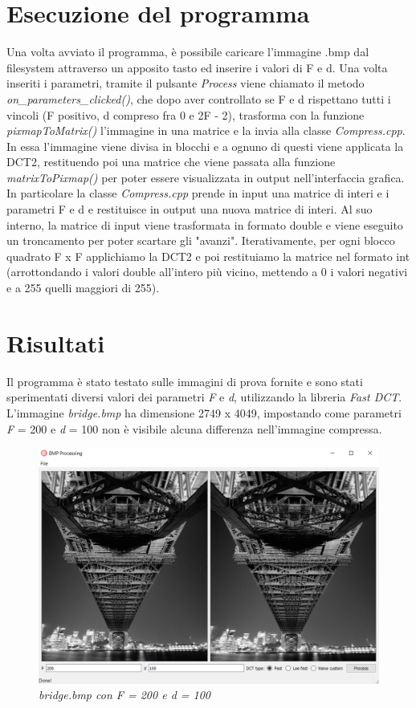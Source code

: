 \documentclass[a4paper,12pt]{report}
\begin{document}
\section{Esecuzione del programma}
Una volta avviato il programma, è possibile caricare l'immagine .bmp dal filesystem attraverso un apposito tasto ed inserire i valori di F e d. Una volta inseriti i parametri, tramite il pulsante \textit{Process} viene chiamato il metodo \textit{on\_parameters\_clicked()}, che dopo aver controllato se F e d rispettano tutti i vincoli (F positivo, d compreso fra 0 e 2F - 2), trasforma con la funzione \textit{pixmapToMatrix()} l'immagine in una matrice e la invia alla classe \textit{Compress.cpp}. In essa l'immagine viene divisa in blocchi e a ognuno di questi viene applicata la DCT2, restituendo poi una matrice che viene passata alla funzione \textit{matrixToPixmap()} per poter essere visualizzata in output nell'interfaccia grafica.\\
In particolare la classe \textit{Compress.cpp} prende in input una matrice di interi e i parametri F e d e restituisce in output una nuova matrice di interi. Al suo interno, la matrice di input viene trasformata in formato double e viene eseguito un troncamento per poter scartare gli "avanzi". Iterativamente, per ogni blocco quadrato F x F applichiamo la DCT2 e poi restituiamo la matrice nel formato int (arrottondando i valori double all'intero più vicino, mettendo a 0 i valori negativi e a 255 quelli maggiori di 255). 
\newpage
\section{Risultati}
Il programma è stato testato sulle immagini di prova fornite e sono stati sperimentati diversi valori dei parametri \textit{F} e \textit{d}, utilizzando la libreria \textit{Fast DCT}.\\

\noindent L'immagine \textit{bridge.bmp} ha dimensione 2749 x 4049, impostando come parametri  \textit{F} = 200 e \textit{d} = 100 non è visibile alcuna differenza nell'immagine compressa.

\begin{figure}[H]
\centering
\includegraphics[width=0.8\linewidth]{../img/bridge_200_100.png}
\caption{\textit{bridge.bmp con F = 200 e d = 100}}
\end{figure}
\end{document}
